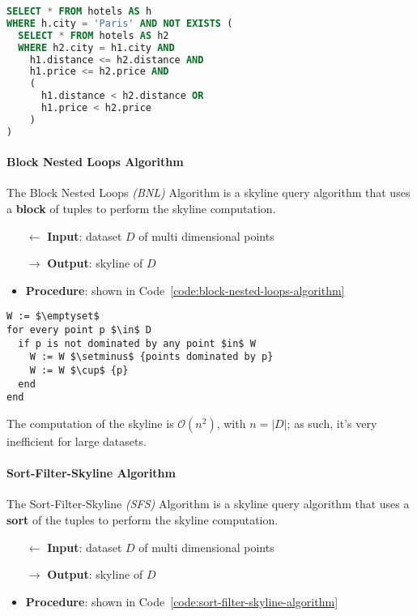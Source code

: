 \documentclass[english]{article}
\begin{document}
\begin{lstlisting}[language=sql, caption={Naive implementation of skyline queries}, label=code:skyline-query-naive]
SELECT * FROM hotels AS h
WHERE h.city = 'Paris' AND NOT EXISTS (
  SELECT * FROM hotels AS h2
  WHERE h2.city = h1.city AND
    h1.distance <= h2.distance AND
    h1.price <= h2.price AND
    (
      h1.distance < h2.distance OR
      h1.price < h2.price
    )
)
\end{lstlisting}

\paragraph{Block Nested Loops Algorithm}

The Block Nested Loops \textit{(BNL)} Algorithm is a skyline query algorithm that uses a \textbf{block} of tuples to perform the skyline computation.

\begin{itemize}
  \item[\(\leftarrow\)] \textbf{Input}: dataset \(D\) of multi dimensional points
  \item[\(\rightarrow\)] \textbf{Output}: skyline of \(D\)
  \item \textbf{Procedure}: shown in Code~\ref{code:block-nested-loops-algorithm}
\end{itemize}

\begin{lstlisting}[caption={Block Nested Loops algorithm}, label=code:block-nested-loops-algorithm]
W := $\emptyset$
for every point p $\in$ D
  if p is not dominated by any point $in$ W
    W := W $\setminus$ {points dominated by p}
    W := W $\cup$ {p}
  end
end
\end{lstlisting}

The computation of the skyline is \(\mathcal{O}\left( n^2 \right)\), with \(n = |D|\); as such, it's very inefficient for large datasets.

\paragraph{Sort-Filter-Skyline Algorithm}

The Sort-Filter-Skyline \textit{(SFS)} Algorithm is a skyline query algorithm that uses a \textbf{sort} of the tuples to perform the skyline computation.

\begin{itemize}
  \item[\(\leftarrow\)] \textbf{Input}: dataset \(D\) of multi dimensional points
  \item[\(\rightarrow\)] \textbf{Output}: skyline of \(D\)
  \item \textbf{Procedure}: shown in Code~\ref{code:sort-filter-skyline-algorithm}
\end{itemize}
\end{document}
